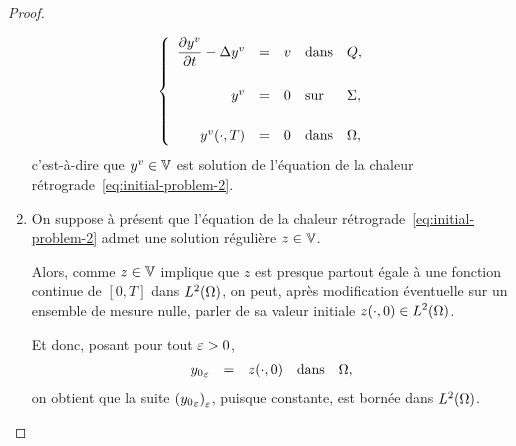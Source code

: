 \begin{proof}
\begin{enumerate}
\begin{equation*}
\begin{cases}
                    \begin{array}{rclll}
                        \dfrac{\partial{}y^{v}}{\partial{}t} - \Delta y^{v} & = & v &
                        \text{dans} & Q,\\
                        \\
                        y^{v} & = & 0 & \text{sur} & \Sigma,\\
                        \\
                        {y^{v}}\!\left({\cdot,T}\right) & = & 0 & \text{dans} & \Omega,
                    \end{array}
                \end{cases}
            \end{equation*}
            c'est-à-dire que $y^{v}\in \mathbb{V}$ est solution de l'équation de
            la chaleur rétrograde~\eqref{eq:initial-problem-2}.
        \item On suppose à présent que l'équation de la chaleur
            rétrograde~\eqref{eq:initial-problem-2} admet une solution
            régulière $z\in \mathbb{V}$.

            Alors, comme $z\in \mathbb{V}$ implique que $z$ est presque partout
            égale à une fonction continue de $[0,T]$ dans $L^{2}\!\left({\Omega}\right)$,
            on peut, après modification éventuelle sur un ensemble de
            mesure nulle, parler de sa valeur initiale $\displaystyle
            {z}\!\left({\cdot, 0}\right)\in L^{2}\!\left({\Omega}\right)$.

            Et donc, posant pour tout $\varepsilon > 0$,
            \begin{equation*}
                \begin{array}{rclll}
                    {y_{0}}_{\varepsilon} & = & {z}\!\left({\cdot, 0}\right) & \text{dans} &
                    \Omega,
                \end{array}
            \end{equation*}
            on obtient que la suite
            ${\left({{y_{0}}_{\varepsilon}}\right)}_{\varepsilon}$, puisque constante,
            est bornée dans $L^{2}\!\left({\Omega}\right)$.
    \end{enumerate}
\end{proof}
